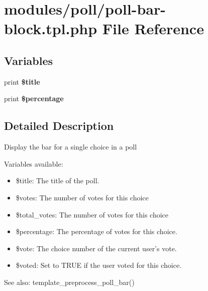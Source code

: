 \hypertarget{poll-bar-block_8tpl_8php}{
\section{modules/poll/poll-bar-block.tpl.php File Reference}
\label{poll-bar-block_8tpl_8php}
}
\subsection*{Variables}
\begin{CompactItemize}
\item 
\hypertarget{poll-bar-block_8tpl_8php_ec2795512d255332f57cacd930a090b4}{
print \textbf{\$title}}
\label{poll-bar-block_8tpl_8php_ec2795512d255332f57cacd930a090b4}

\item 
\hypertarget{poll-bar-block_8tpl_8php_271a067b3e16b6916b6d2fb7961ccd85}{
print \textbf{\$percentage}}
\label{poll-bar-block_8tpl_8php_271a067b3e16b6916b6d2fb7961ccd85}

\end{CompactItemize}


\subsection{Detailed Description}
Display the bar for a single choice in a poll

Variables available:\begin{itemize}
\item \$title: The title of the poll.\item \$votes: The number of votes for this choice\item \$total\_\-votes: The number of votes for this choice\item \$percentage: The percentage of votes for this choice.\item \$vote: The choice number of the current user's vote.\item \$voted: Set to TRUE if the user voted for this choice.\end{itemize}


\begin{Desc}
\item[See also:]template\_\-preprocess\_\-poll\_\-bar() \end{Desc}
